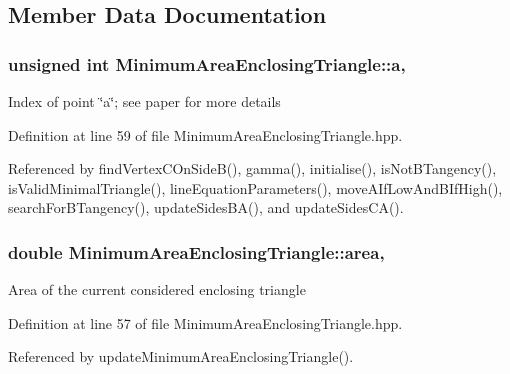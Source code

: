 \subsection{Member Data Documentation}
\hypertarget{classmultiscale_1_1MinimumAreaEnclosingTriangle_a982681b52b0d6c14fa4a193165639469}{
\subsubsection[{a}]{\setlength{\rightskip}{0pt plus 5cm}unsigned int Minimum\-Area\-Enclosing\-Triangle\-::a\hspace{0.3cm}{\ttfamily [static]}, {\ttfamily [private]}}}\label{classmultiscale_1_1MinimumAreaEnclosingTriangle_a982681b52b0d6c14fa4a193165639469}
Index of point \char`\"{}a\char`\"{}; see paper for more details 

Definition at line 59 of file Minimum\-Area\-Enclosing\-Triangle.\-hpp.



Referenced by find\-Vertex\-C\-On\-Side\-B(), gamma(), initialise(), is\-Not\-B\-Tangency(), is\-Valid\-Minimal\-Triangle(), line\-Equation\-Parameters(), move\-A\-If\-Low\-And\-B\-If\-High(), search\-For\-B\-Tangency(), update\-Sides\-B\-A(), and update\-Sides\-C\-A().

\hypertarget{classmultiscale_1_1MinimumAreaEnclosingTriangle_a8631cd58e7083b9ed99a1ad173e2694d}{
\subsubsection[{area}]{\setlength{\rightskip}{0pt plus 5cm}double Minimum\-Area\-Enclosing\-Triangle\-::area\hspace{0.3cm}{\ttfamily [static]}, {\ttfamily [private]}}}\label{classmultiscale_1_1MinimumAreaEnclosingTriangle_a8631cd58e7083b9ed99a1ad173e2694d}
Area of the current considered enclosing triangle 

Definition at line 57 of file Minimum\-Area\-Enclosing\-Triangle.\-hpp.



Referenced by update\-Minimum\-Area\-Enclosing\-Triangle().


